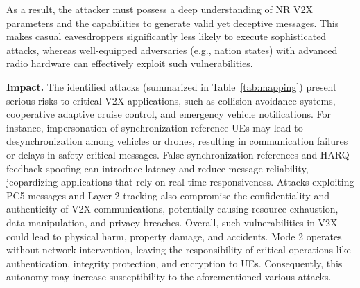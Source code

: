 As a result, the attacker must possess a deep understanding of NR V2X parameters and the capabilities to generate valid yet deceptive messages. This makes casual eavesdroppers significantly less likely to execute sophisticated attacks, whereas well-equipped adversaries (e.g., nation states) with advanced radio hardware can effectively exploit such vulnerabilities. 

\textbf{Impact.} The identified attacks (summarized in Table~\ref{tab:mapping}) present serious risks to critical V2X applications, such as collision avoidance systems, cooperative adaptive cruise control, and emergency vehicle notifications. For instance, impersonation of synchronization reference UEs may lead to desynchronization among vehicles or drones, resulting in communication failures or delays in safety-critical messages. False synchronization references and HARQ feedback spoofing can introduce latency and reduce message reliability, jeopardizing applications that rely on real-time responsiveness. Attacks exploiting PC5 messages and Layer-2 tracking also compromise the confidentiality and authenticity of V2X communications, potentially causing resource exhaustion, data manipulation, and privacy breaches. Overall, such vulnerabilities in V2X could lead to physical harm, property damage, and accidents. Mode 2 operates without network intervention, leaving the responsibility of critical operations like authentication, integrity protection, and encryption to UEs. Consequently, this autonomy may increase susceptibility to the aforementioned various attacks.

